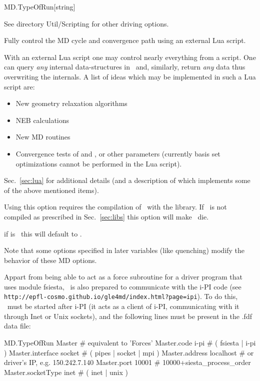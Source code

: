 \begin{fdfentry}{MD.TypeOfRun}[string]
\begin{fdfoptions}
    See directory Util/Scripting  for other driving
    options.

    \option[Lua]%
    Fully control the MD cycle and convergence path using an external
    Lua script. 

    With an external Lua script one may control nearly everything from
    a script. One can query \emph{any} internal data-structures in
    \siesta\ and, similarly, return \emph{any} data thus overwriting
    the internals. A list of ideas which may be implemented in such a
    Lua script are:
    \begin{itemize}
      \item New geometry relaxation algorithms

      \item NEB calculations

      \item New MD routines

      \item Convergence tests of  and
      , or other parameters (currently basis
      set optimizations cannot be performed in the Lua script).

    \end{itemize}
    Sec.~\ref{sec:lua} for additional details (and a description of
     which implements some of the above mentioned items).

    Using this option requires the compilation of \siesta\ with the
     library.%
    If \siesta\ is not compiled as prescribed in Sec.~\ref{sec:libs}
    this option will make \siesta\ die.

  \end{fdfoptions}

  \note if  is \fdftrue\ this will default
  to .

  Note that some options specified in later variables (like quenching)
  modify the behavior of these MD options.

  Appart from being able to act as a force subroutine for a driver
  program that uses module fsiesta, \siesta\ is also prepared to
  communicate with the i-PI code (see
  \texttt{http://epfl-cosmo.github.io/gle4md/index.html?page=ipi}).
  To do this, \siesta\ must be started after i-PI (it acts as a client
  of i-PI, communicating with it through Inet or Unix sockets), and
  the following lines must be present in the .fdf data file:
  \begin{fdfexample}
     MD.TypeOfRun      Master     # equivalent to 'Forces'
     Master.code       i-pi       # ( fsiesta | i-pi )
     Master.interface  socket     # ( pipes | socket | mpi )
     Master.address    localhost  # or driver's IP, e.g. 150.242.7.140
     Master.port       10001      # 10000+siesta_process_order
     Master.socketType inet       # ( inet | unix )
  \end{fdfexample}

\end{fdfentry}



